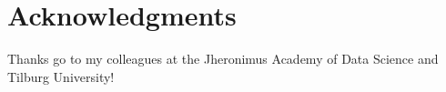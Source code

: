 \documentclass{jss}\usepackage[]{graphicx}\usepackage[]{color}
\begin{document}
\section{Acknowledgments}

Thanks go to my colleagues at the Jheronimus Academy of Data Science and Tilburg University!

%

\end{document}
